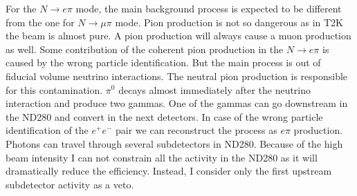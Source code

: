 \documentclass[../main.tex]{subfiles}
\begin{document}
For the $N\to e\pi$ mode, the main background process is expected to be different from the one for $N\to\mu\pi$ mode. Pion production is not so dangerous as in T2K the beam is almost pure. A pion production will always cause a muon production as well. Some contribution of the coherent pion production in the $N\to e\pi$ is caused by the wrong particle identification. But the main process is out of fiducial volume neutrino interactions. The neutral pion production is responsible for this contamination. $\pi^0$ decays almost immediately after the neutrino interaction and produce two gammas. One of the gammas can go downstream in the ND280 and convert in the next detectors. In case of the wrong particle identification of the $e^+e^-$ pair we can reconstruct the process as $e\pi$ production. Photons can travel through several subdetectors in ND280. Because of the high beam intensity I can not constrain all the activity in the ND280 as it will dramatically reduce the efficiency. Instead, I consider only the first upstream subdetector activity as a veto.
\end{document}
